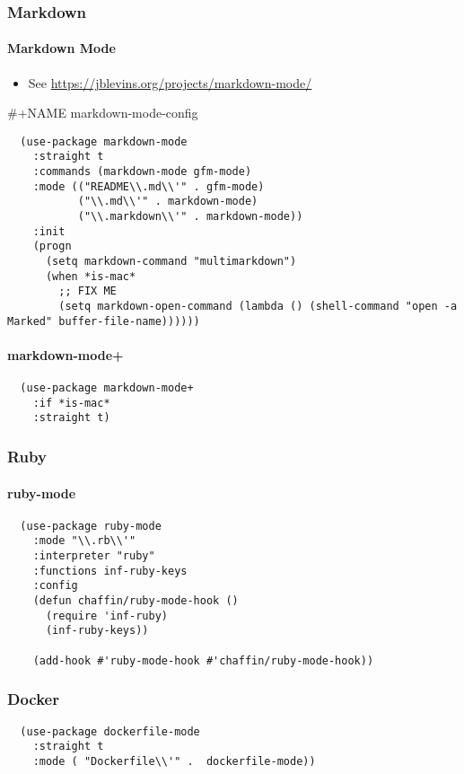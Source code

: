 \documentclass[11pt]{article}
\begin{document}
\subsubsection*{Markdown}
\label{sec:orgeabe2a4}
\paragraph*{Markdown Mode}
\label{sec:org7f3fd67}

\begin{itemize}
\item See \url{https://jblevins.org/projects/markdown-mode/}
\end{itemize}

\#+NAME markdown-mode-config
\begin{verbatim}
  (use-package markdown-mode
    :straight t
    :commands (markdown-mode gfm-mode)
    :mode (("README\\.md\\'" . gfm-mode)
           ("\\.md\\'" . markdown-mode)
           ("\\.markdown\\'" . markdown-mode))
    :init
    (progn
      (setq markdown-command "multimarkdown")
      (when *is-mac*
        ;; FIX ME
        (setq markdown-open-command (lambda () (shell-command "open -a Marked" buffer-file-name))))))
\end{verbatim}

\paragraph*{markdown-mode+}
\label{sec:org3ce1866}

\begin{verbatim}
  (use-package markdown-mode+
    :if *is-mac*
    :straight t)
\end{verbatim}
\subsubsection*{Ruby}
\label{sec:org9fe9e03}
\paragraph*{ruby-mode}
\label{sec:org6042ed3}

\begin{verbatim}
  (use-package ruby-mode
    :mode "\\.rb\\'"
    :interpreter "ruby"
    :functions inf-ruby-keys
    :config
    (defun chaffin/ruby-mode-hook ()
      (require 'inf-ruby)
      (inf-ruby-keys))

    (add-hook #'ruby-mode-hook #'chaffin/ruby-mode-hook))
\end{verbatim}
\subsubsection*{Docker}
\label{sec:org57159f7}

\begin{verbatim}
  (use-package dockerfile-mode
    :straight t
    :mode ( "Dockerfile\\'" .  dockerfile-mode))
\end{verbatim}
\end{document}
